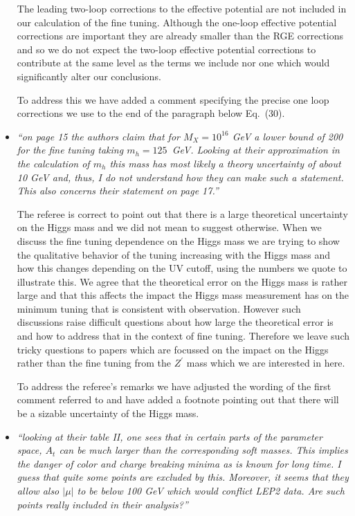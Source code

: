 \documentclass[12pt]{article}
\begin{document}
\begin{itemize}
The leading two-loop corrections to the effective potential are not
included in our calculation of the fine tuning.  Although the one-loop
effective potential corrections are important they are already smaller
than the RGE corrections and so we do not expect the two-loop
effective potential corrections to contribute at the same level as
the terms we include nor one which would significantly alter our
conclusions.

To address this we have added a comment specifying the precise one
loop corrections we use to the end of the paragraph below Eq.~(30).

\item {\it ``on page 15 the authors claim that for $M_X = 10^{16}$ GeV a
lower bound of 200 for the fine tuning taking $m_h = 125$~GeV. Looking
at their approximation in the calculation of $m_h$ this mass has most
likely a theory uncertainty of about 10 GeV and, thus, I do not
understand how they can make such a statement.  This also concerns
their statement on page 17.''}

The referee is correct to point out that there is a large theoretical
uncertainty on the Higgs mass and we did not mean to suggest
otherwise.  When we discuss the fine tuning dependence on the Higgs
mass we are trying to show the qualitative behavior of the tuning
increasing with the Higgs mass and how this changes depending on the
UV cutoff, using the numbers we quote to illustrate this.  We agree
that the theoretical error on the Higgs mass is rather large and that
this affects the impact the Higgs mass measurement has on the minimum
tuning that is consistent with observation.  However such discussions
raise difficult questions about how large the theoretical error is and
how to address that in the context of fine tuning.  Therefore we leave
such tricky questions to papers which are focussed on the impact on
the Higgs rather than the fine tuning from the $Z^\prime$ mass which
we are interested in here.

To address the referee's remarks we have adjusted the wording of the
first comment referred to and have added a footnote pointing out that
there will be a sizable uncertainty of the Higgs mass.

\item {\it ``looking at their table II, one sees that in certain parts of
the parameter space, $A_t$ can be much larger than the corresponding soft
masses. This implies the danger of color and charge breaking minima as is
known for long time. I guess that quite some points are excluded by this.
Moreover, it seems that they allow also $|\mu|$ to be below 100 GeV which
would conflict LEP2 data. Are such points really included in their analysis?''}


\end{itemize}
\end{document}
